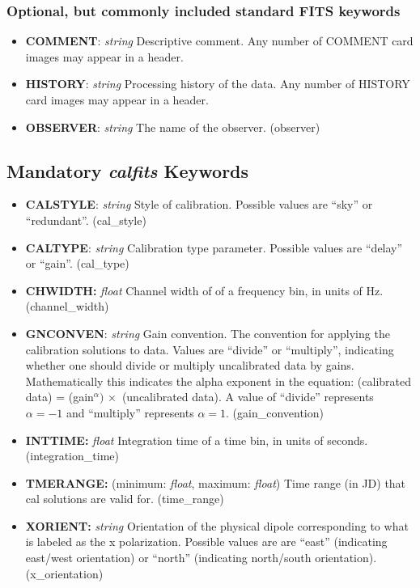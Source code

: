 \documentclass[11pt, oneside, english]{article}   	%
\begin{document}
	\subsubsection{Optional, but commonly included standard FITS keywords}
	\begin{itemize}
	\item{\textbf{COMMENT}: \emph{string} Descriptive comment. Any number of COMMENT card images may
	appear in a header.}
	\item{\textbf{HISTORY}: \emph{string} Processing history of the data. Any number of HISTORY card images may appear in a header.}
	\item{\textbf{OBSERVER}: \emph{string} The name of the observer. (observer)}
	\end{itemize}
	
	
\subsection{Mandatory \emph{calfits} Keywords}
\begin{itemize}
\item{\textbf{CALSTYLE}: \emph{string} Style of calibration. Possible values are ``sky'' or ``redundant''. (cal\_style)}
\item{\textbf{CALTYPE}: \emph{string} Calibration type parameter. Possible values are ``delay'' or ``gain''. (cal\_type)}
\item{\textbf{CHWIDTH:} \emph{float} Channel width of of a frequency bin, in units of Hz. (channel\_width)}
\item{\textbf{GNCONVEN}: \emph{string} Gain convention. The convention for applying the calibration solutions to data.
Values are ``divide'' or ``multiply'', indicating whether one should divide or multiply uncalibrated data by gains. 
Mathematically this indicates the alpha exponent in the equation: 
    (calibrated data) = (gain$^{\alpha}) \,  \times $ (uncalibrated data). A value of
    ``divide'' represents $\alpha=-1$ and ``multiply'' represents $\alpha=1$. (gain\_convention)}
\item{\textbf{INTTIME:} \emph{float} Integration time of a time bin, in units of seconds. (integration\_time)}
\item{\textbf{TMERANGE:} (minimum: \emph{float}, maximum: \emph{float}) Time range (in JD) that cal solutions are valid for. (time\_range)}
\item{\textbf{XORIENT:} \emph{string} Orientation of the physical dipole corresponding to what is labeled as the x polarization. Possible values are are ``east'' (indicating east/west orientation) or ``north'' (indicating north/south orientation). (x\_orientation)}
\end{itemize}
\end{document}
